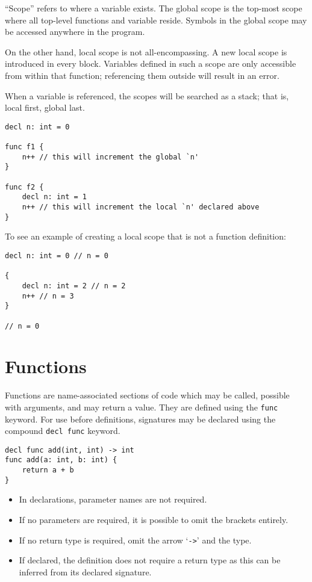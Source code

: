 \documentclass{article}
\begin{document}
``Scope'' refers to where a variable exists.
The global scope is the top-most scope where all top-level functions and variable reside.
Symbols in the global scope may be accessed anywhere in the program.

On the other hand, local scope is not all-encompassing.
A new local scope is introduced in every block.
Variables defined in such a scope are only accessible from within that function; referencing them outside will result in an error.

When a variable is referenced, the scopes will be searched as a stack; that is, local first, global last.

\begin{lstlisting}[language=CustomLang]
decl n: int = 0

func f1 {
    n++ // this will increment the global `n'
}

func f2 {
    decl n: int = 1
    n++ // this will increment the local `n' declared above
}
\end{lstlisting}

To see an example of creating a local scope that is not a function definition:

\begin{lstlisting}[language=CustomLang]
decl n: int = 0 // n = 0

{
    decl n: int = 2 // n = 2
    n++ // n = 3
}

// n = 0
\end{lstlisting}

\section{Functions}

Functions are name-associated sections of code which may be called, possible with arguments, and may return a value.
They are defined using the \texttt{func} keyword.
For use before definitions, signatures may be declared using the compound \texttt{decl func} keyword.

\begin{lstlisting}[language=CustomLang]
decl func add(int, int) -> int
func add(a: int, b: int) {
    return a + b
}
\end{lstlisting}

\begin{itemize}
    \item In declarations, parameter names are not required.
    \item If no parameters are required, it is possible to omit the brackets entirely.
    \item If no return type is required, omit the arrow `\texttt{->}' and the type.
    \item If declared, the definition does not require a return type as this can be inferred from its declared signature.
\end{itemize}
\end{document}
